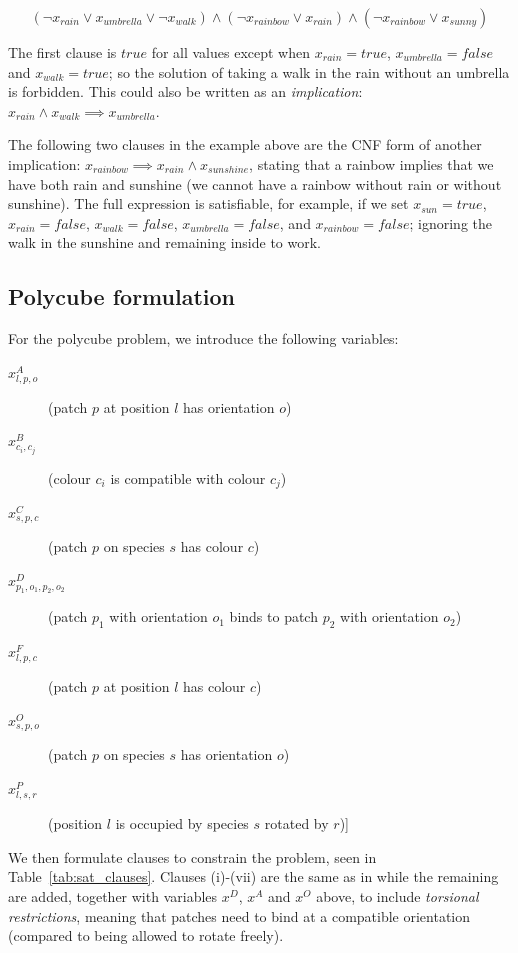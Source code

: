\[
    (\lnot x_{rain} \lor x_{umbrella} \lor  \lnot x_{walk}) \land
    (\lnot x_{rainbow} \lor x_{rain}) \land
    (\lnot x_{rainbow} \lor x_{sunny})
\]

The first clause is \({true}\) for all values except when \(x_{rain}={true}\), \(x_{umbrella}={false}\) and \(x_{walk}=true\); so the solution of taking a walk in the rain without an umbrella is forbidden. This could also be written as an \emph{implication}: \(x_{rain} \land x_{walk} \implies x_{umbrella}\).

The following two clauses in the example above are the CNF form of another implication: \(x_{rainbow} \implies  x_{rain} \land x_{sunshine}\), stating that a rainbow implies that we have both rain and sunshine (we cannot have a rainbow without rain or without sunshine). The full expression is satisfiable, for example, if we set \(x_{sun}=true\), \(x_{rain}=false\), \(x_{walk}=false\), \(x_{umbrella}=false\), and \(x_{rainbow}=false\); ignoring the walk in the sunshine and remaining inside to work.

\subsection{Polycube formulation}

For the polycube problem, we introduce the following variables:
\begin{description}
    \item[\(x_{l,p,o}^{A}\)] (patch \(p\) at position \(l\) has orientation \(o\))
    \item[\(x_{c_i,c_j}^{B}\)] (colour \(c_i\) is compatible with colour \(c_j\))
    \item[\(x_{s,p,c}^{C}\)] (patch \(p\) on species \(s\) has colour \(c\))
    \item[\(x_{p_1,o_1,p_2,o_2}^{D}\)] (patch \(p_1\) with orientation \(o_1\) binds to patch \(p_2\) with orientation \(o_2\))
    \item[\(x_{l,p,c}^{F}\)] (patch \(p\) at position \(l\) has colour \(c\))
    \item[\(x_{s,p,o}^{O}\)] (patch \(p\) on species \(s\) has orientation \(o\))
    \item[\(x_{l,s,r}^{P}\)] (position \(l\) is occupied by species \(s\) rotated by \(r\))] 
\end{description}

We then formulate clauses to constrain the problem, seen in Table~\ref{tab:sat_clauses}. Clauses (i)-(vii) are the same as in \cite{romano2020designing} while the remaining are added, together with variables \(x^D\), \(x^A\) and \(x^O\) above, to include \emph{torsional restrictions}, meaning that patches need to bind at a compatible orientation (compared to being allowed to rotate freely).


